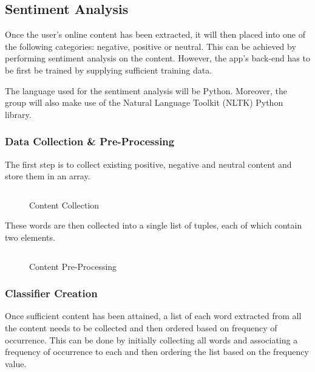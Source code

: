 
\subsection{Sentiment Analysis}

Once the user's online content has been extracted, it will then placed into one of the following categories: negative, positive or neutral. This can be achieved by performing sentiment analysis on the content. However, the app's back-end has to be first be trained by supplying sufficient training data.

The language used for the sentiment analysis will be Python. Moreover, the group will also make use of the Natural Language Toolkit (NLTK) Python library.

\subsubsection{Data Collection \& Pre-Processing}

The first step is to collect existing positive, negative and neutral content and store them in an array.

\begin{figure}[h!]
  \centering
  \begin{minipage}{14cm}
    \centering
    \inputminted[fontsize=\footnotesize]{python}{inc/snippets/collection.py}
    \caption{Content Collection}
    \label{fig:sentiment_analysis_step1a}
  \end{minipage}
\end{figure}

These words are then collected into a single list of tuples, each of which contain two elements.

\begin{figure}[h!]
  \centering
  \begin{minipage}{14cm}
    \centering
    \inputminted[fontsize=\footnotesize]{python}{inc/snippets/collection_iteration.py}
    \caption{Content Pre-Processing}
    \label{fig:sentiment_analysis_step1b}
  \end{minipage}
\end{figure}

\subsubsection{Classifier Creation}

Once sufficient content has been attained, a list of each word extracted from all the content needs to be collected and then ordered based on frequency of occurrence. This can be done by initially collecting all words and associating a frequency of occurrence to each and then ordering the list based on the frequency value. 

